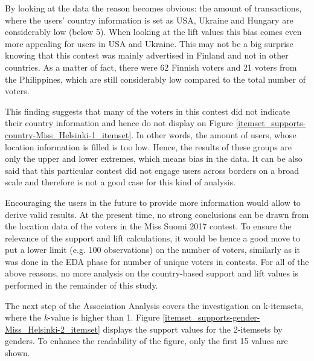 By looking at the data the reason becomes obvious: the amount of transactions, where the users' country information is set as USA, Ukraine and Hungary are considerably low (below 5). When looking at the lift values this bias comes even more appealing for users in USA and Ukraine. This may not be a big surprise knowing that this contest was mainly advertised in Finland and not in other countries. As a matter of fact, there were 62 Finnish voters and 21 voters from the Philippines, which are still considerably low compared to the total number of voters. 

This finding suggests that many of the voters in this contest did not indicate their country information and hence do not display on Figure \ref{itemset_supports-country-Miss_Helsinki-1_itemset}. In other words, the amount of users, whose location information is filled is too low. Hence, the results of these groups are only the upper and lower extremes, which means bias in the data. It can be also said that this particular contest did not engage users across borders on a broad scale and therefore is not a good case for this kind of analysis.

Encouraging the users in the future to provide more information would allow to derive valid results. At the present time, no strong conclusions can be drawn from the location data of the voters in the Miss Suomi 2017 contest. To ensure the relevance of the support and lift calculations, it would be hence a good move to put a lower limit (e.g. 100 observations) on the number of voters, similarly as it was done in the EDA phase for number of unique voters in contests. For all of the above reasons, no more analysis on the country-based support and lift values is performed in the remainder of this study.

\pagebreak

The next step of the Association Analysis covers the investigation on k-itemsets, where the \emph{k}-value is higher than 1. Figure \ref{itemset_supports-gender-Miss_Helsinki-2_itemset} displays the support values for the 2-itemsets by genders. To enhance the readability of the figure, only the first 15 values are shown. 

